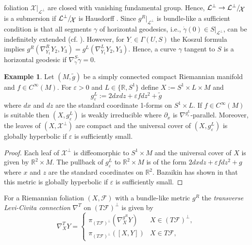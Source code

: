 \documentclass[a4paper,10pt,twoside]{amsart}
\theoremstyle{definition}
\newtheorem{example}[theorem]{Example}
\theoremstyle{remark}
\numberwithin{equation}{section}
\begin{document}
foliation $\mathcal{X}|_{\mathcal{L}^{\perp}}$ are closed with vanishing fundamental group. Hence,
$\mathcal{L}^{\perp}\rightarrow {{{\mathcal{L}^{\perp}}}/\!\raisebox{-.575ex}{\ensuremath{{\mathcal{X}}}}}$ is a submersion if ${{{\mathcal{L}^{\perp}}}/\!\raisebox{-.575ex}{\ensuremath{{\mathcal{X}}}}}$ is Hausdorff
\cite{MR1453120}. Since $g^{R}|_{\mathcal{L}^{\perp}}$ is bundle-like a sufficient condition is that all segments $\gamma$ of horizontal geodesics, i.e.,
$\dot{\gamma}(0) \in S|_{\mathcal{L}^{\perp}}$, can be indefinitely extended (cf. \cite{MR0142130}). However, for
$Y_{\cdot} \in \Gamma(U,S)$ the Koszul formula implies $g^{R}(\nabla^{R}_{Y_{1}}{Y_{2}},Y_{3}) = g^{L}(\nabla^{L}_{Y_{1}}{Y_{2}},Y_{3})$. Hence, a curve
$\gamma$ tangent to $S$ is a horizontal geodesic if $\nabla^{S}_{\dot{\gamma}}{\dot{\gamma}}=0$.
\begin{example}\label{bazaikin-example}
	Let $(M,\tilde{g})$ be a simply connected compact Riemannian manifold and $f \in C^{\infty}(M)$. For $\varepsilon >0$ and $L \in \{{\mathbb{R}}, S^{1}\}$
	define $X:= S^{1} \times L \times M$ and
	\begin{equation*}
		g^{L}_{\varepsilon} := 2dxdz + \varepsilon fdz^{2} + \tilde{g}
	\end{equation*}
	where $dx$ and $dz$ are the standard coordinate 1-forms on $S^{1} \times L$. If $f \in C^{\infty}(M)$ is suitable then $(X,g^{L}_{\varepsilon})$
	is weakly irreducible where $\partial_{x}$ is $\nabla^{g^{L}_{\varepsilon}}$-parallel. Moreover, the leaves of $(X,\mathcal{X}^{\perp})$
	are compact and the universal cover of $(X,g^{L}_{\varepsilon})$ is globally hyperbolic if $\varepsilon$ is sufficiently small.
\end{example}
\begin{proof}
	Each leaf of $\mathcal{X}^{\perp}$ is diffeomorphic to $S^{1} \times M$ and the universal cover of $X$ is given by ${\mathbb{R}}^{2} \times M$.
	The pullback of $g^{L}_{\varepsilon}$ to ${\mathbb{R}}^{2} \times M$ is of the form $2dxdz + \varepsilon fdz^{2} + g$ where $x$ and $z$ are
	the standard coordinates on ${\mathbb{R}}^{2}$. Bazaikin has shown in \cite[Thm. 2]{bazaikin-2009} that this metric is globally hyperbolic if
	$\varepsilon$ is sufficiently small.
\end{proof}
For a Riemannian foliation $(X,\mathcal{F})$ with a bundle-like metric $g^{R}$ the {\em transverse Levi-Civita connection} $\nabla^{T}$ on
$(T\mathcal{F})^{\perp}$ is given by
\begin{equation*}
	\nabla^{T}_{X}{Y} = \begin{cases}
				\pi_{(T\mathcal{F})^{\perp}}(\nabla^{g^{R}}_{X}{Y}) & X \in (T\mathcal{F})^{\perp},\\
				\pi_{(T\mathcal{F})^{\perp}}([X,Y]) & X \in T\mathcal{F},
	                    \end{cases}
\end{equation*}
\end{document}
